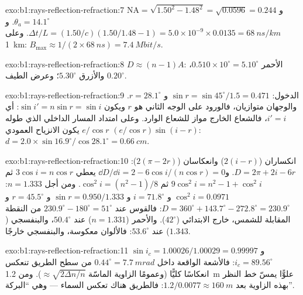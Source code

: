 \begin{solution}{exo:b1:rays-reflection-refraction:7}
$\mathrm{NA} = \sqrt{1.50^2 - 1.48^2} = \sqrt{0.0596} = 0.244$ و
$\theta_a = 14.1^\circ$. و$\Delta t/L = (1.50/c)(1.50/1.48 - 1) =
5.0\times10^{-9} \times 0.0135 = \qty{68}{ns/km}$. وعلى \qty{1}{km}:
$B_{\max} \approx 1/(2 \times \qty{68}{ns}) = \qty{7.4}{Mbit/s}$.
\end{solution}

\begin{solution}{exo:b1:rays-reflection-refraction:8}
$D \approx (n - 1)A$: الأحمر $0.510 \times 10^\circ = 5.10^\circ$، والأزرق
$5.30^\circ$؛ وعرض الطيف $0.20^\circ$.
\end{solution}

\begin{solution}{exo:b1:rays-reflection-refraction:9}
الدخول: $\sin r = \sin 45^\circ/1.5 = 0.471$ و $r = 28.1^\circ$. والوجهان
متوازيان، فالورود على الوجه الثاني هو $r$ ويكون
$\sin i' = n\sin r = \sin i$: أي $i' = i$، فالشعاع الخارج مواز
للشعاع الوارد. وعلى امتداد المسار الداخلي الذي طوله $e/\cos r$ يكون
الانزياح العمودي $(e/\cos r)\sin(i - r)$:
$d = 2.0 \times \sin 16.9^\circ/\cos 28.1^\circ = \qty{0.66}{cm}$.
\end{solution}

\begin{solution}{exo:b1:rays-reflection-refraction:10}
انكساران ($2(i - r)$) وانعكاسان ($2(\pi - 2r)$):
$D = 2\pi + 2i - 6r$. و$\dd D/\dd i = 2 - 6\cos i/(n\cos r) = 0$ يعطي
$3\cos i = n\cos r$ ثم $9\cos^2 i = n^2 - 1 + \cos^2 i$ ثم $\cos^2 i =
(n^2 - 1)/8$. ومن أجل $n = 1.333$: $\cos^2 i = 0.0971$ و $i = 71.8^\circ$ و
$\sin r = 0.950/1.333$ و $r = 45.5^\circ$ و $D = 360^\circ + 143.7^\circ -
272.8^\circ = 230.9^\circ$: فالقوس عند $230.9^\circ - 180^\circ =
51^\circ$ من النقطة المقابلة للشمس، خارج الابتدائي ($42^\circ$).
والأحمر ($n = 1.331$) عند $50.4^\circ$، والبنفسجي ($1.343$) عند $53.6^\circ$:
فالألوان معكوسة، والبنفسجي خارجًا.
\end{solution}

\begin{solution}{exo:b1:rays-reflection-refraction:11}
$\sin i_c = 1.00026/1.00029 = 0.99997$ و $i_c = 89.56^\circ$: فالأشعة
الواقعة داخل $0.44^\circ = \qty{7.7}{mrad}$ من سطح الطريق تنعكس
انعكاسًا كليًّا (وعمومًا الزاوية الماسّة $\approx \sqrt{2\Delta n/n}$). ومن
\qty{1.2}{m} علوًّا يمسّ خط النظر بهذه الزاوية بعد
$1.2/0.0077 \approx \qty{160}{m}$: فالطريق هناك تعكس السماء ---
وهي ``البركة''.
\end{solution}

